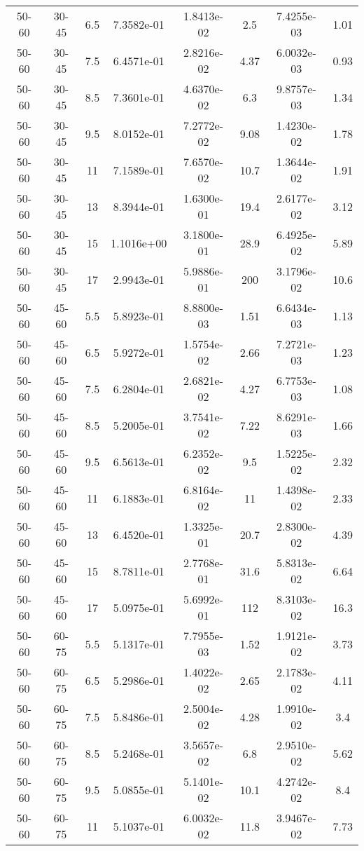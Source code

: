 \begin{longtable}{|cccccccc|}
50-60 & 30-45 & 6.5 & 7.3582e-01 & 1.8413e-02 & 2.5 & 7.4255e-03 & 1.01 \\ 
50-60 & 30-45 & 7.5 & 6.4571e-01 & 2.8216e-02 & 4.37 & 6.0032e-03 & 0.93 \\ 
50-60 & 30-45 & 8.5 & 7.3601e-01 & 4.6370e-02 & 6.3 & 9.8757e-03 & 1.34 \\ 
50-60 & 30-45 & 9.5 & 8.0152e-01 & 7.2772e-02 & 9.08 & 1.4230e-02 & 1.78 \\ 
50-60 & 30-45 & 11 & 7.1589e-01 & 7.6570e-02 & 10.7 & 1.3644e-02 & 1.91 \\ 
50-60 & 30-45 & 13 & 8.3944e-01 & 1.6300e-01 & 19.4 & 2.6177e-02 & 3.12 \\ 
50-60 & 30-45 & 15 & 1.1016e+00 & 3.1800e-01 & 28.9 & 6.4925e-02 & 5.89 \\ 
50-60 & 30-45 & 17 & 2.9943e-01 & 5.9886e-01 & 200 & 3.1796e-02 & 10.6 \\ 
\hline
50-60 & 45-60 & 5.5 & 5.8923e-01 & 8.8800e-03 & 1.51 & 6.6434e-03 & 1.13 \\ 
50-60 & 45-60 & 6.5 & 5.9272e-01 & 1.5754e-02 & 2.66 & 7.2721e-03 & 1.23 \\ 
50-60 & 45-60 & 7.5 & 6.2804e-01 & 2.6821e-02 & 4.27 & 6.7753e-03 & 1.08 \\ 
50-60 & 45-60 & 8.5 & 5.2005e-01 & 3.7541e-02 & 7.22 & 8.6291e-03 & 1.66 \\ 
50-60 & 45-60 & 9.5 & 6.5613e-01 & 6.2352e-02 & 9.5 & 1.5225e-02 & 2.32 \\ 
50-60 & 45-60 & 11 & 6.1883e-01 & 6.8164e-02 & 11 & 1.4398e-02 & 2.33 \\ 
50-60 & 45-60 & 13 & 6.4520e-01 & 1.3325e-01 & 20.7 & 2.8300e-02 & 4.39 \\ 
50-60 & 45-60 & 15 & 8.7811e-01 & 2.7768e-01 & 31.6 & 5.8313e-02 & 6.64 \\ 
50-60 & 45-60 & 17 & 5.0975e-01 & 5.6992e-01 & 112 & 8.3103e-02 & 16.3 \\ 
\hline
50-60 & 60-75 & 5.5 & 5.1317e-01 & 7.7955e-03 & 1.52 & 1.9121e-02 & 3.73 \\ 
50-60 & 60-75 & 6.5 & 5.2986e-01 & 1.4022e-02 & 2.65 & 2.1783e-02 & 4.11 \\ 
50-60 & 60-75 & 7.5 & 5.8486e-01 & 2.5004e-02 & 4.28 & 1.9910e-02 & 3.4 \\ 
50-60 & 60-75 & 8.5 & 5.2468e-01 & 3.5657e-02 & 6.8 & 2.9510e-02 & 5.62 \\ 
50-60 & 60-75 & 9.5 & 5.0855e-01 & 5.1401e-02 & 10.1 & 4.2742e-02 & 8.4 \\ 
50-60 & 60-75 & 11 & 5.1037e-01 & 6.0032e-02 & 11.8 & 3.9467e-02 & 7.73 \\ 

\end{longtable}
